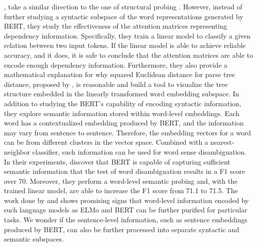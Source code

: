 \documentclass[11pt,a4paper]{article}
\begin{document}
\cite{coenen2019visualizing}, take a similar direction to the one of structural probing \citep{hewitt-manning-2019-structural}. 
However, instead of further studying a syntactic subspace of the word representations generated by BERT, they study the effectiveness of the attention matrices representing dependency information. 
Specifically, they train a linear model to classify a given relation between two input tokens.
If the linear model is able to achieve reliable accuracy, and it does, it is safe to conclude that the attention matrices are able to encode enough dependency information.
Furthermore, they also provide a mathematical explanation for why squared Euclidean distance for parse tree distance, proposed by \cite{hewitt-manning-2019-structural}, is reasonable and build a tool to visualize the tree structure embedded in the linearly transformed word embedding subspace. 
In addition to studying the BERT's capability of encoding syntactic information, they explore semantic information stored within word-level embeddings. 
Each word has a contextualized embedding produced by BERT, and the information may vary from sentence to sentence. 
Therefore, the embedding vectors for a word can be from different clusters in the vector space. 
Combined with a nearest-neighbor classifier, such information can be used for word sense disambiguation.
In their experiments, \cite{coenen2019visualizing} discover that BERT is capable of capturing sufficient semantic information that the test of word disambiguation results in a F1 score over 70.
Moreover, they perform a word-level semantic probing and, with the trained linear model, are able to increase the F1 score from 71.1 to 71.5. The work done by \cite{hewitt-manning-2019-structural} and \cite{coenen2019visualizing} shows promising signs that word-level information encoded by such language models as ELMo and BERT can be further purified for particular tasks. 
We wonder if the sentence-level information, such as sentence embeddings produced by BERT, can also be further processed into separate syntactic and semantic subspaces.
\end{document}
